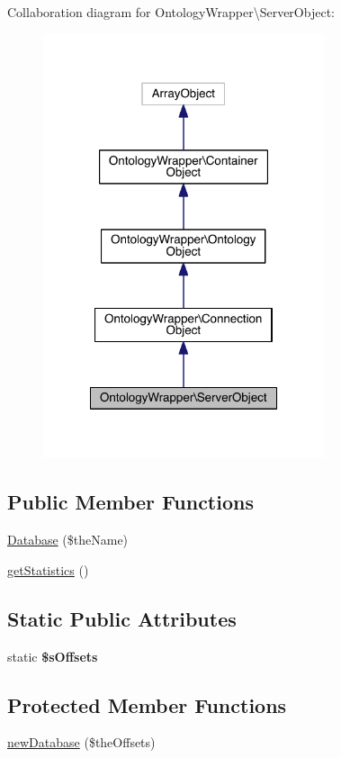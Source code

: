 Collaboration diagram for Ontology\-Wrapper\textbackslash{}Server\-Object\-:
\nopagebreak
\begin{figure}[H]
\begin{center}
\leavevmode
\includegraphics[width=234pt]{class_ontology_wrapper_1_1_server_object__coll__graph}
\end{center}
\end{figure}
\subsection*{Public Member Functions}
\begin{DoxyCompactItemize}
\item 
\hyperlink{class_ontology_wrapper_1_1_server_object_a3ce047db243e208640e8eaf89b986c7a}{Database} (\$the\-Name)
\item 
\hyperlink{class_ontology_wrapper_1_1_server_object_afdff50c16982e3266578d75d1fb19dea}{get\-Statistics} ()
\end{DoxyCompactItemize}
\subsection*{Static Public Attributes}
\begin{DoxyCompactItemize}
\item 
static {\bfseries \$s\-Offsets}
\end{DoxyCompactItemize}
\subsection*{Protected Member Functions}
\begin{DoxyCompactItemize}
\item 
\hyperlink{class_ontology_wrapper_1_1_server_object_a0ba24c5513d7b5dc168a0d058adb2aca}{new\-Database} (\$the\-Offsets)
\end{DoxyCompactItemize}
